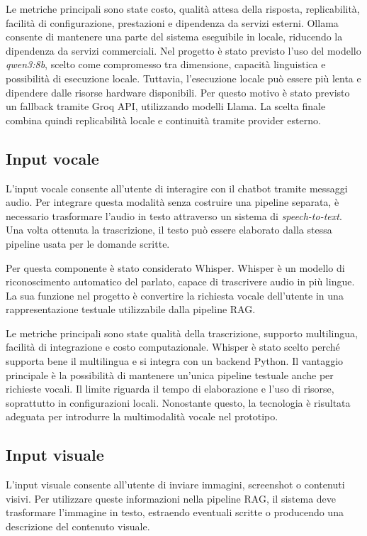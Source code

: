 Le metriche principali sono state costo, qualità attesa della risposta, replicabilità, facilità di configurazione, prestazioni e dipendenza da servizi esterni. Ollama consente di mantenere una parte del sistema eseguibile in locale, riducendo la dipendenza da servizi commerciali. Nel progetto è stato previsto l’uso del modello \textit{qwen3:8b}, scelto come compromesso tra dimensione, capacità linguistica e possibilità di esecuzione locale. Tuttavia, l’esecuzione locale può essere più lenta e dipendere dalle risorse hardware disponibili. Per questo motivo è stato previsto un fallback tramite Groq API, utilizzando modelli Llama. La scelta finale combina quindi replicabilità locale e continuità tramite provider esterno.

\subsection*{Input vocale}

L’input vocale consente all’utente di interagire con il chatbot tramite messaggi audio. Per integrare questa modalità senza costruire una pipeline separata, è necessario trasformare l’audio in testo attraverso un sistema di \textit{speech-to-text}. Una volta ottenuta la trascrizione, il testo può essere elaborato dalla stessa pipeline usata per le domande scritte.

Per questa componente è stato considerato Whisper. Whisper è un modello di riconoscimento automatico del parlato, capace di trascrivere audio in più lingue. La sua funzione nel progetto è convertire la richiesta vocale dell’utente in una rappresentazione testuale utilizzabile dalla pipeline RAG.

Le metriche principali sono state qualità della trascrizione, supporto multilingua, facilità di integrazione e costo computazionale. Whisper è stato scelto perché supporta bene il multilingua e si integra con un backend Python. Il vantaggio principale è la possibilità di mantenere un’unica pipeline testuale anche per richieste vocali. Il limite riguarda il tempo di elaborazione e l’uso di risorse, soprattutto in configurazioni locali. Nonostante questo, la tecnologia è risultata adeguata per introdurre la multimodalità vocale nel prototipo.

\subsection*{Input visuale}

L’input visuale consente all’utente di inviare immagini, screenshot o contenuti visivi. Per utilizzare queste informazioni nella pipeline RAG, il sistema deve trasformare l’immagine in testo, estraendo eventuali scritte o producendo una descrizione del contenuto visuale.

